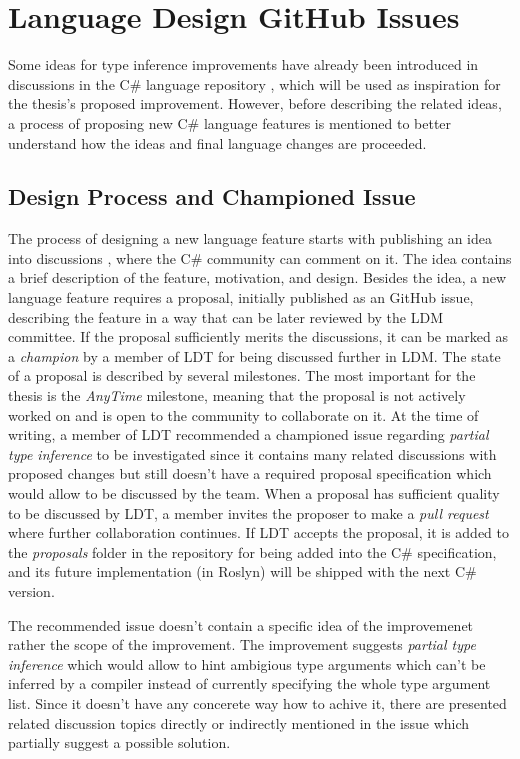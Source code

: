 \section{Language Design GitHub Issues} \label{sect04:github}

Some ideas for type inference improvements have already been introduced in discussions in the C\# language repository \cite{online:langRepo}, which will be used as inspiration for the thesis’s proposed improvement.
However, before describing the related ideas, a process of proposing new C\# language features is mentioned to better understand how the ideas and final language changes are proceeded.

\subsection{Design Process and Championed Issue} \label{sect:champion}

The process of designing a new language feature starts with publishing an idea into discussions \cite{online:discussions}, where the C\# community can comment on it. 
The idea contains a brief description of the feature, motivation, and design. 
Besides the idea, a new language feature requires a proposal, initially published as an GitHub issue, describing the feature in a way that can be later reviewed by the LDM committee.
If the proposal sufficiently merits the discussions, it can be marked as a \textit{champion} by a member of LDT for being discussed further in LDM. 
The state of a proposal is described by several milestones. 
The most important for the thesis is the \textit{AnyTime} milestone, meaning that the proposal is not actively worked on and is open to the community to collaborate on it. 
At the time of writing, a member of LDT recommended a championed issue \cite{online:champion} regarding \textit{partial type inference} to be investigated since it contains many related discussions with proposed changes but still doesn’t have a required proposal specification which would allow to be discussed by the team. 
When a proposal has sufficient quality to be discussed by LDT, a member invites the proposer to make a \textit{pull request} where further collaboration continues. 
If LDT accepts the proposal, it is added to the \textit{proposals} folder in the repository for being added into the C\# specification, and its future implementation (in Roslyn) will be shipped with the next C\# version. 
\par
The recommended issue doesn't contain a specific idea of the improvemenet rather the scope of the improvement.
The improvement suggests \textit{partial type inference} which would allow to hint ambigious type arguments which can't be inferred by a compiler instead of currently specifying the whole type argument list.
Since it doesn't have any concerete way how to achive it, there are presented related discussion topics directly or indirectly mentioned in the issue which partially suggest a possible solution.

